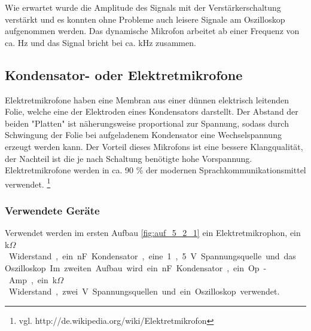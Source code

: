 \documentclass[12pt,a4paper]{article}
\begin{document}
Wie erwartet wurde die Amplitude des Signals mit der Verstärkerschaltung verstärkt und es konnten ohne Probleme auch leisere Signale am Oszilloskop aufgenommen werden. Das dynamische Mikrofon arbeitet ab einer Frequenz von ca. \unit[850]{Hz} und das Signal bricht bei ca. \unit[3]{kHz} zusammen.

\subsection{Kondensator- oder Elektretmikrofone}
Elektretmikrofone haben eine Membran aus einer dünnen elektrisch leitenden Folie, welche eine der Elektroden eines Kondensators darstellt. Der Abstand der beiden "Platten" ist näherungsweise proportional zur Spannung, sodass durch Schwingung der Folie bei aufgeladenem Kondensator eine Wechselspannung erzeugt werden kann. Der Vorteil dieses Mikrofons ist eine bessere Klangqualität, der Nachteil ist die je nach Schaltung benötigte hohe Vorspannung. Elektretmikrofone werden in ca. 90 \% der modernen Sprachkommunikationsmittel verwendet. \footnote{vgl. http://de.wikipedia.org/wiki/Elektretmikrofon} 
\subsubsection*{Verwendete Geräte}
Verwendet werden im ersten Aufbau \ref{fig:auf_5_2_1} ein Elektretmikrophon, ein \unit[4,7]{k$\Omega$} Widerstand, ein \unit[10]{nF} Kondensator, eine 1,5 V Spannungsquelle und das Oszilloskop. Im zweiten Aufbau wird ein \unit[100]{nF} Kondensator, ein Op-Amp, ein \unit[100]{k$\Omega$} Widerstand, zwei \unit[9]{V} Spannungsquellen und ein Oszilloskop verwendet. 
\end{document}
